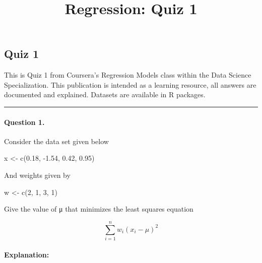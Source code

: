 \documentclass[
]{article}
\title{Regression: Quiz 1}
\author{}
\date{\vspace{-2.5em}}
\newenvironment{Shaded}{\begin{snugshade}}{\end{snugshade}}
\newcommand{\DecValTok}[1]{\textcolor[rgb]{0.00,0.00,0.81}{#1}}
\newcommand{\FloatTok}[1]{\textcolor[rgb]{0.00,0.00,0.81}{#1}}
\newcommand{\FunctionTok}[1]{\textcolor[rgb]{0.00,0.00,0.00}{#1}}
\newcommand{\NormalTok}[1]{#1}
\newcommand{\OtherTok}[1]{\textcolor[rgb]{0.56,0.35,0.01}{#1}}
\newcommand{\SpecialCharTok}[1]{\textcolor[rgb]{0.00,0.00,0.00}{#1}}
\begin{document}
\maketitle

\hypertarget{quiz-1}{%
\subsection{Quiz 1}\label{quiz-1}}

This is Quiz 1 from Coursera's Regression Models class within the Data
Science Specialization. This publication is intended as a learning
resource, all answers are documented and explained. Datasets are
available in R packages.

\begin{center}\rule{0.5\linewidth}{0.5pt}\end{center}

\hypertarget{question-1.}{%
\paragraph{Question 1.}\label{question-1.}}

Consider the data set given below

\begin{Shaded}
\begin{Highlighting}[]
\NormalTok{x }\OtherTok{\textless{}{-}} \FunctionTok{c}\NormalTok{(}\FloatTok{0.18}\NormalTok{, }\SpecialCharTok{{-}}\FloatTok{1.54}\NormalTok{, }\FloatTok{0.42}\NormalTok{, }\FloatTok{0.95}\NormalTok{)}
\end{Highlighting}
\end{Shaded}

And weights given by

\begin{Shaded}
\begin{Highlighting}[]
\NormalTok{w }\OtherTok{\textless{}{-}} \FunctionTok{c}\NormalTok{(}\DecValTok{2}\NormalTok{, }\DecValTok{1}\NormalTok{, }\DecValTok{3}\NormalTok{, }\DecValTok{1}\NormalTok{)}
\end{Highlighting}
\end{Shaded}

Give the value of μ that minimizes the least squares equation

\[\sum^{n}_{i=1}w_i(x_i−\mu)^2\]

\hypertarget{explanation}{%
\paragraph{Explanation:}\label{explanation}}
\end{document}
